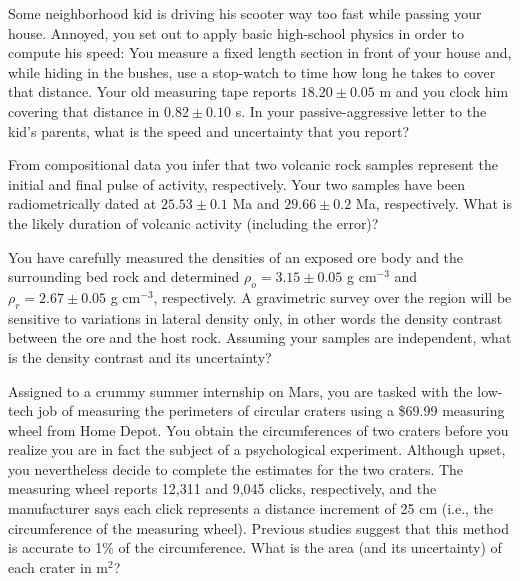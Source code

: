 \begin{problem}
Some neighborhood kid is driving his scooter way too fast while passing your house. Annoyed, you set out to apply
basic high-school physics in order to compute his speed: You measure a fixed length section
in front of your house and, while hiding in the bushes, use a stop-watch to time how long he takes to cover that distance.
Your old measuring tape reports $18.20 \pm 0.05$ m and you clock him covering that distance in
$0.82 \pm 0.10$ s.  In your passive-aggressive letter to the kid's parents, what is the speed and uncertainty
that you report?
\end{problem}

\begin{problem}
From compositional data you infer that two volcanic rock samples represent the initial and final
pulse of activity, respectively.  Your two samples have been radiometrically dated at
$25.53 \pm 0.1$ Ma and $29.66 \pm 0.2$ Ma, respectively.
What is the likely duration of volcanic activity (including the error)?
\end{problem}

\begin{problem}
You have carefully measured the densities of an exposed ore body and the surrounding bed rock and determined
$\rho_o = 3.15 \pm 0.05$ g cm$^{-3}$ and $\rho_r = 2.67 \pm 0.05$ g cm$^{-3}$, respectively.  A gravimetric survey over the region
will be sensitive to variations in lateral density only, in other words the density contrast between the
ore and the host rock.  Assuming your samples are independent, what is the density contrast and its uncertainty?
\end{problem}

\begin{problem}
Assigned to a crummy summer internship on Mars, you are tasked with the low-tech job of measuring the perimeters
of circular craters using a \$69.99 measuring wheel from Home Depot.  You obtain the circumferences of two craters
before you realize you are in fact the subject of a psychological experiment.  Although upset, you nevertheless decide
to complete the estimates for the two craters.  The measuring wheel reports 12,311 and 9,045
clicks, respectively, and the manufacturer says each click represents a distance increment of 25 cm (i.e., the circumference of the
measuring wheel).  Previous studies suggest that this method is accurate to 1\% of the circumference.
What is the area (and its uncertainty) of each crater in m$^2$?
\end{problem}

